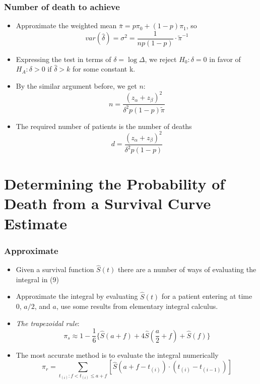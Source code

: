 \documentclass{beamer}
\newcommand{\empr}[1]{{\emph{\color{red}#1}}}
\begin{document}
\pagebreak
\begin{frame}
\frametitle{Number of death to achieve}
\begin{itemize}
\item Approximate the weighted mean $\bar{\pi} = p\pi_0 + (1-p)\pi_1$, so
\begin{equation}
var(\hat{\delta}) = \sigma^2 = \frac{1}{np(1-p)} \cdot {\tilde{\pi}}^{-1}
\end{equation}
\item Expressing the test in terms of $\delta = \log \Delta$, we reject $H_0: \delta=0$ in favor of $H_A: \delta>0$ if $\hat{\delta}>k$ for some constant k.	
\item By the similar argument before, we get $n$:
\begin{equation}
n = \frac{(z_\alpha + z_\beta)^2}{\delta^2 p(1-p)\tilde{\pi}}
\end{equation}
\item The required number of patients is the number of deaths
\begin{equation}
d = \frac{(z_\alpha + z_\beta)^2}{\delta^2 p(1-p)}
\end{equation}
\end{itemize}
\end{frame}


\section{Determining the Probability of Death from a Survival Curve Estimate}
\begin{frame}
\frametitle{Approximate}
\begin{itemize}
\item Given a survival function $\hat{S}(t)$ there are a number of ways of evaluating the integral in (9)
\item Approximate the integral by evaluating $\hat{S}(t)$ for a patient entering at time 0, $a/2$, and $a$, use some results from elementary integral calculus.
\item \empr{The trapezoidal rule}:
\begin{equation}
\pi_s \approx 1-\frac{1}{6} \big\lbrace \hat{S}(a+f) +4\hat{S}(\frac{a}{2} + f) +\hat{S}(f) \big\rbrace
\end{equation}
\item The most accurate method is to evaluate the integral numerically
\begin{equation}
\pi_r = \sum\limits_{t_{(i)}:f<t_{(i)} \le a+f}^{}[\hat{S}(a+f-t_{(i)})\cdot (t_{(i)} - t_{(i-1)})]
\end{equation}
\end{itemize}
\end{frame}
\end{document}
